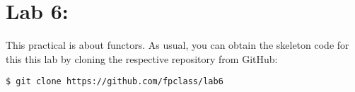 \section{Lab 6: \practicalSixTitle}

This practical is about functors. As usual, you can obtain the skeleton code for this this lab by cloning the respective repository from GitHub:
\begin{verbatim}
$ git clone https://github.com/fpclass/lab6
\end{verbatim}
